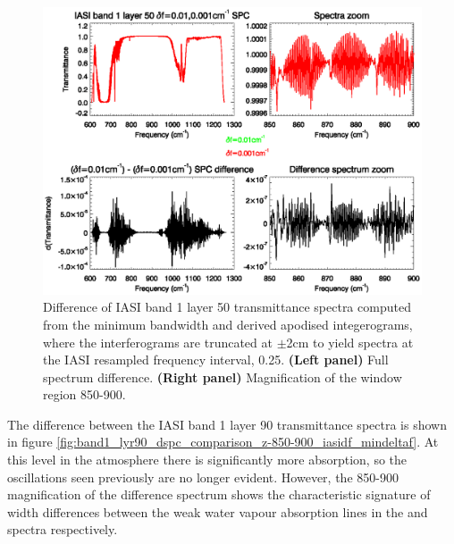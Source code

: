 \begin{figure}[htp]
  \centering
  \includegraphics[bb=70 230 540 390,clip,scale=0.8]{graphics/band1_lyr50_dspc_comparison_z-850-900_iasidf_mindeltaf.eps}
  \caption{Difference of IASI band 1 layer 50 transmittance spectra computed from the minimum bandwidth  and  derived apodised integerograms, where the interferograms are truncated at $\pm$2cm to yield spectra at the IASI resampled frequency interval, 0.25\invcm. \textbf{(Left panel)} Full spectrum difference. \textbf{(Right panel)} Magnification of the window region 850-900\invcm.}
  \label{fig:band1_lyr50_dspc_comparison_z-850-900_iasidf_mindeltaf}
\end{figure}

The difference between the IASI band 1 layer 90 transmittance spectra is shown in figure \ref{fig:band1_lyr90_dspc_comparison_z-850-900_iasidf_mindeltaf}. At this level in the atmosphere there is significantly more absorption, so the oscillations seen previously are no longer evident. However, the 850-900\invcm{} magnification of the difference spectrum shows the characteristic signature of width differences between the weak water vapour absorption lines in the  and  spectra respectively.
  
